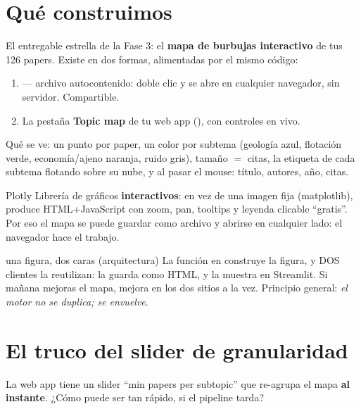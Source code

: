 \documentclass[11pt,a4paper]{article}
\begin{document}

\section{Qué construimos}

El entregable estrella de la Fase 3: el \textbf{mapa de burbujas interactivo} de tus 126
papers. Existe en dos formas, alimentadas por el mismo código:
\begin{enumerate}
  \item {} --- archivo autocontenido: doble clic y se abre
        en cualquier navegador, sin servidor. Compartible.
  \item La pestaña \textbf{Topic map} de tu web app (), con controles en vivo.
\end{enumerate}

Qué se ve: un punto por paper, un color por subtema (geología azul, flotación verde,
economía/ajeno naranja, ruido gris), tamaño $=$ citas, la etiqueta de cada subtema flotando
sobre su nube, y al pasar el mouse: título, autores, año, citas.

\begin{concepto}{Plotly}
Librería de gráficos \textbf{interactivos}: en vez de una imagen fija (matplotlib), produce
HTML+JavaScript con zoom, pan, tooltips y leyenda clicable ``gratis''. Por eso el mapa se
puede guardar como archivo y abrirse en cualquier lado: el navegador hace el trabajo.
\end{concepto}

\begin{concepto}{una figura, dos caras (arquitectura)}
La función  en  construye la figura, y
DOS clientes la reutilizan:  la guarda como HTML, y 
la muestra en Streamlit. Si mañana mejoras el mapa, mejora en los dos sitios a la vez.
Principio general: \emph{el motor no se duplica; se envuelve}.
\end{concepto}

\section{El truco del slider de granularidad}

La web app tiene un slider ``min papers per subtopic'' que re-agrupa el mapa \textbf{al
instante}. ¿Cómo puede ser tan rápido, si el pipeline tarda?
\end{document}
